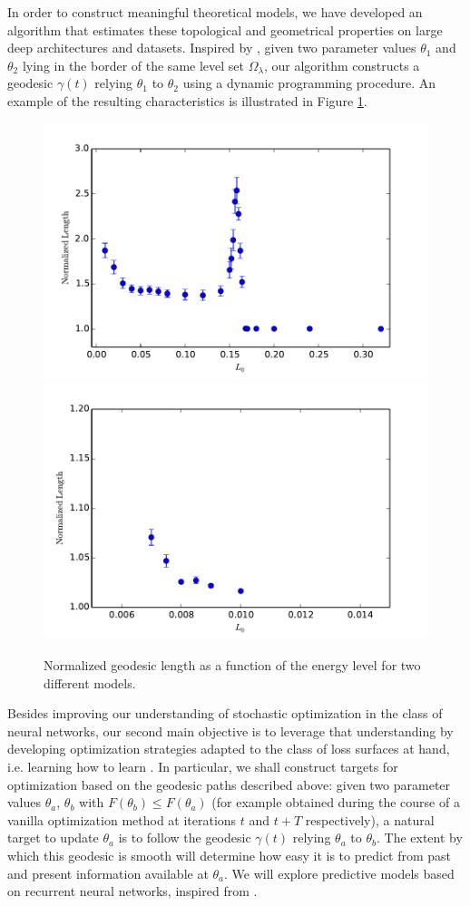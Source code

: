\documentclass[11pt]{article}
\begin{document}
In order to construct meaningful theoretical models, we have developed an algorithm that estimates these topological and geometrical properties on large deep architectures and datasets. Inspired by \cite{vinyalsetal}, given two parameter values $\theta_1$ and $\theta_2$ lying in the border of the same level set $\Omega_\lambda$, our algorithm constructs a geodesic $\gamma(t)$ relying $\theta_1$ to $\theta_2$ using a dynamic programming procedure. An example of the resulting characteristics is illustrated in Figure \ref{figurelength}. 

\begin{figure}
\centering
\includegraphics[width=.4\textwidth]{../Writeup/Plots/normlengthcubics}
\includegraphics[width=.4\textwidth]{../Writeup/Plots/normlengthMNIST}
\label{figurelength}
\caption{Normalized geodesic length as a function of the energy level for two different models.}
\end{figure}

Besides improving our understanding of stochastic optimization in the class of neural networks, our second main objective is to leverage that understanding 
by developing optimization strategies adapted to the class of loss surfaces at hand, i.e. learning how to learn \cite{learn2learn}. 
In particular, we shall construct targets for optimization based on the geodesic paths described above: given two parameter values 
$\theta_a$, $\theta_b$ with $F(\theta_b) \leq F(\theta_a)$ (for example obtained during the course of a vanilla optimization method at iterations $t$ and $t+T$ respectively), a natural target to update $\theta_a$ is to follow the geodesic $\gamma(t)$ relying $\theta_a$ to $\theta_b$. 
The extent by which this geodesic is smooth will determine how easy it is to predict from past and present information available at $\theta_a$. We will explore predictive models based on recurrent neural networks, inspired from \cite{learn2learn}.
\end{document}
